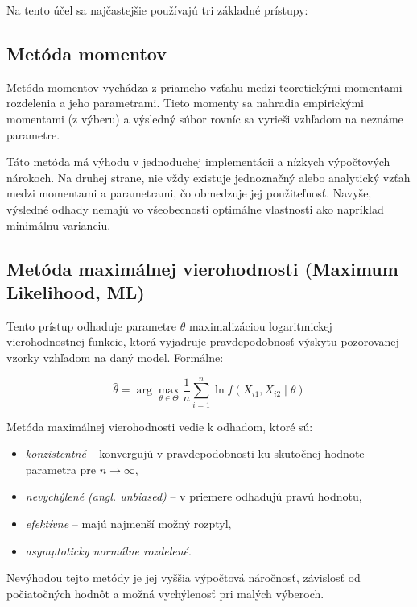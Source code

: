 Na tento účel sa najčastejšie používajú tri základné prístupy:

\subsection{Metóda momentov}\label{subsection:moments_method}

Metóda momentov vychádza z priameho vzťahu medzi teoretickými momentami rozdelenia a jeho parametrami. Tieto momenty sa nahradia empirickými momentami (z výberu) a výsledný súbor rovníc sa vyrieši vzhľadom na neznáme parametre.

Táto metóda má výhodu v jednoduchej implementácii a nízkych výpočtových nárokoch. Na druhej strane, nie vždy existuje jednoznačný alebo analytický vzťah medzi momentami a parametrami, čo obmedzuje jej použiteľnosť. Navyše, výsledné odhady nemajú vo všeobecnosti optimálne vlastnosti ako napríklad minimálnu varianciu.

\subsection{Metóda maximálnej vierohodnosti (Maximum Likelihood, ML)}\label{subsection:max_likelihood}

Tento prístup odhaduje parametre $\theta$ maximalizáciou logaritmickej vierohodnostnej funkcie, ktorá vyjadruje pravdepodobnosť výskytu pozorovanej vzorky vzhľadom na daný model. Formálne:

\begin{equation}
\hat{\theta} = \arg\max_{\theta \in \Theta} \frac{1}{n} \sum_{i=1}^{n} \ln f(X_{i1}, X_{i2} \mid \theta)
\end{equation}

Metóda maximálnej vierohodnosti vedie k odhadom, ktoré sú:
\begin{itemize}
  \item \textit{konzistentné} – konvergujú v pravdepodobnosti ku skutočnej hodnote parametra pre $n \to \infty$,
  \item \textit{nevychýlené (angl. unbiased)} – v priemere odhadujú pravú hodnotu,
  \item \textit{efektívne} – majú najmenší možný rozptyl,
  \item \textit{asymptoticky normálne rozdelené}.
\end{itemize}

Nevýhodou tejto metódy je jej vyššia výpočtová náročnosť, závislosť od počiatočných hodnôt a možná vychýlenosť pri malých výberoch.

